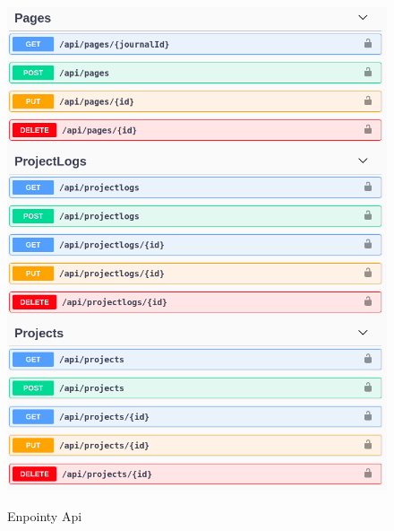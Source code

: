 \documentclass[a4paper,11pt]{report}
\begin{document}
\begin{figure}[H]
	\centering
	\includegraphics[scale=0.5]{implementacja/backend/pages_projectLogs_projects_api}\\
	\caption{Enpointy Api}
	\label{fig:pages_projectLogs_projects_api}
\end{figure}
\end{document}
